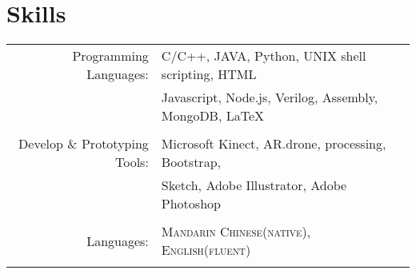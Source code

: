 \documentclass[a4paper,11pt]{article} %
\begin{document}







\section{Skills}

\begin{tabular}{rl}
Programming Languages: & C/C++, JAVA, Python, UNIX shell scripting, HTML
			\\&		   
			Javascript, Node.js, Verilog, Assembly, MongoDB, {\fb \LaTeX}\setmainfont[SmallCapsFont=Fontin SmallCaps]{Fontin-Regular}\\
			&\\

Develop \& Prototyping Tools: & Microsoft Kinect, AR.drone, processing, Bootstrap,\\
& Sketch, Adobe Illustrator, Adobe Photoshop\\
&\\

Languages: & \textsc{Mandarin Chinese(native)}, \textsc{English(fluent)}\\
&\\

\end{tabular}
\end{document}
